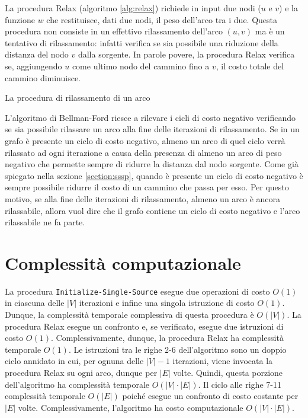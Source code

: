 \documentclass[12pt,a4paper,oneside]{book}
\begin{document}
	La procedura Relax (algoritmo \ref{alg:relax}) richiede in input due nodi ($u$ e $v$) e la funzione $w$ che restituisce, dati due nodi, il peso dell'arco tra i due. Questa procedura non consiste in un effettivo rilassamento dell'arco $(u,v)$ ma è un tentativo di rilassamento: infatti verifica se sia possibile una riduzione della distanza del nodo $v$ dalla sorgente. In parole povere, la procedura Relax verifica se, aggiungendo $u$ come ultimo nodo del cammino fino a $v$, il costo totale del cammino diminuisce.
	
	\begin{algorithm}
		\caption{La procedura di rilassamento di un arco}
		\label{alg:relax}
	\end{algorithm}
	
	L'algoritmo di Bellman-Ford riesce a rilevare i cicli di costo negativo verificando se sia possibile rilassare un arco alla fine delle iterazioni di rilassamento. Se in un grafo è presente un ciclo di costo negativo, almeno un arco di quel ciclo verrà rilassato ad ogni iterazione a causa della presenza di almeno un arco di peso negativo che permette sempre di ridurre la distanza dal nodo sorgente. Come già spiegato nella sezione \ref{section:sssp}, quando è presente un ciclo di costo negativo è sempre possibile ridurre il costo di un cammino che passa per esso. Per questo motivo, se alla fine delle iterazioni di rilassamento, almeno un arco è ancora rilassabile, allora vuol dire che il grafo contiene un ciclo di costo negativo e l'arco rilassabile ne fa parte.

	\section{Complessità computazionale}
	La procedura \texttt{Initialize-Single-Source} esegue due operazioni di costo $O(1)$ in ciascuna delle $|V|$ iterazioni e infine una singola istruzione di costo $O(1)$. Dunque, la complessità temporale complessiva di questa procedura è $O(|V|)$. La procedura Relax esegue un confronto e, se verificato, esegue due istruzioni di costo $O(1)$. Complessivamente, dunque, la procedura Relax ha complessità temporale $O(1)$. Le istruzioni tra le righe 2-6 dell'algoritmo sono un doppio ciclo annidato in cui, per ognuna delle $|V|-1$ iterazioni, viene invocata la procedura Relax su ogni arco, dunque per $|E|$ volte. Quindi, questa porzione dell'algoritmo ha complessità temporale $O(|V|\cdot |E|)$. Il ciclo alle righe 7-11 complessità temporale $O(|E|)$ poiché esegue un confronto di costo costante per $|E|$ volte. Complessivamente, l'algoritmo ha costo computazionale $O(|V|\cdot |E|)$.
	
\end{document}
